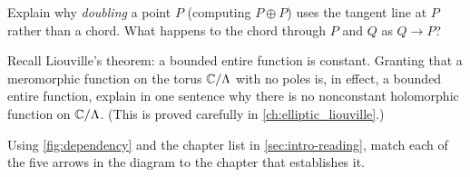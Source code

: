 \begin{exercise}
\label{ex:intro-tangent}
Explain why \emph{doubling} a point \(P\) (computing \(P \oplus P\)) uses the
tangent line at \(P\) rather than a chord. What happens to the chord through
\(P\) and \(Q\) as \(Q \to P\)?
\end{exercise}

\begin{exercise}
\label{ex:intro-liouville}
Recall Liouville's theorem: a bounded entire function is constant. Granting that
a meromorphic function on the torus \(\mathbb{C}/\Lambda\) with no poles is, in effect,
a bounded entire function, explain in one sentence why there is no nonconstant
holomorphic function on \(\mathbb{C}/\Lambda\). (This is proved carefully in
\cref{ch:elliptic_liouville}.)
\end{exercise}

\begin{exercise}
\label{ex:intro-map-arrows}
Using \cref{fig:dependency} and the chapter list in
\cref{sec:intro-reading}, match each of the five arrows in the diagram to the
chapter that establishes it.
\end{exercise}
